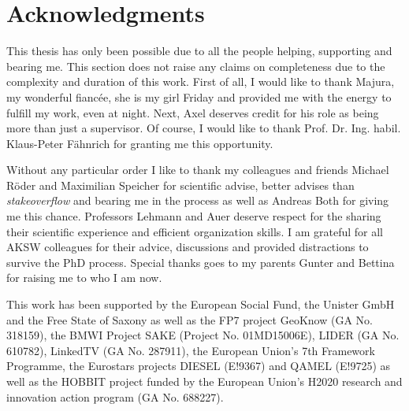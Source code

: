 



\bigskip

\begingroup
\let\clearpage\relax
\let\cleardoublepage\relax
\let\cleardoublepage\relax
\chapter*{Acknowledgments}
This thesis has only been possible due to all the people helping, supporting and bearing me.
This section does not raise any claims on completeness due to the complexity and duration of this work.
First of all, I would like to thank Majura, my wonderful fiancée, she is my girl Friday and provided me with the energy to fulfill my work, even at night.
Next, Axel deserves credit for his role as being more than just a supervisor. 
Of course, I would like to thank Prof. Dr. Ing. habil. Klaus-Peter F\"ahnrich for granting me this opportunity.
 
\bigskip

Without any particular order I like to thank my colleagues and friends Michael Röder and Maximilian Speicher for scientific advise, better advises than \emph{stakeoverflow} and bearing me in the process as well as Andreas Both for giving me this chance.
Professors Lehmann and Auer deserve respect for the sharing their scientific experience and efficient organization skills. 
I am grateful for all AKSW colleagues for their advice, discussions and provided distractions to survive the PhD process. 
Special thanks goes to my parents Gunter and Bettina for raising me to who I am now. 


\bigskip


This work has been supported by the European Social Fund, the Unister GmbH and the Free State of Saxony as well as the FP7 project GeoKnow (GA No. 318159), the BMWI Project SAKE (Project No. 01MD15006E), LIDER (GA No. 610782), LinkedTV (GA No. 287911), the European Union's 7th Framework Programme, the Eurostars projects DIESEL (E!9367) and QAMEL (E!9725) as well as the HOBBIT project funded by the European Union's H2020 research and innovation action program (GA No. 688227).


\endgroup



